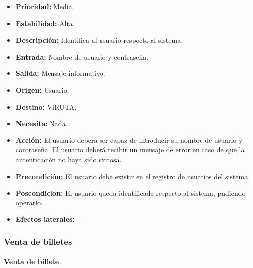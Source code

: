 \begin{itemize}
\item \textbf{Prioridad:} Media.
\item \textbf{Estabilidad:} Alta.
\item \textbf{Descripción:} Identifica al usuario respecto al sistema.
\item \textbf{Entrada:} Nombre de usuario y contraseña.
\item \textbf{Salida:} Mensaje informativo.
\item\textbf{ Origen:} Usuario.
\item \textbf{Destino:} VIRUTA.
\item \textbf{Necesita:} Nada.
\item \textbf{Acción:} El usuario deberá ser capaz de introducir su nombre de usuario y contraseña. El usuario deberá recibir un mensaje de error en caso de que la autenticación no haya sido exitosa.
\item \textbf{Precondición:} El usuario debe existir en el registro de usuarios del sistema.
\item \textbf{Poscondicion:} El usuario queda identificado respecto al sistema, pudiendo operarlo.
\item \textbf{Efectos laterales:} --
\end{itemize}

\subsubsection{Venta de billetes}

\paragraph{Venta de billete}


